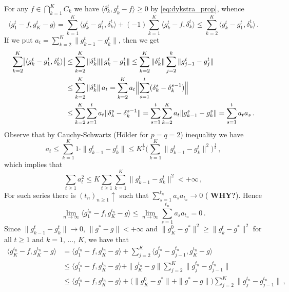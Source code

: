 \documentclass[a4paper]{article}
\begin{document}

For any $f\in \bigcap_{k=1}^K C_k$ we have $\langle \delta^t_k,  g^t_k - f \rangle
\geq 0$ by \eqref{eq:dykstra_prop}, whence
\begin{equation*}
  \langle g^t_1 - f, g^t_K - g \rangle
    = \sum_{k=1}^K \langle g^t_k - g^t_1, \delta^t_k \rangle
      + (-1) \sum_{k=1}^K \langle g^t_k - f, \delta^t_k \rangle
    \leq \sum_{k=2}^K \langle g^t_k - g^t_1, \delta^t_k \rangle
      \,.
\end{equation*}
If we put $a_t = \sum_{k=2}^K \| g^t_{k-1} - g^t_k \|$, then we get
\begin{align*}
  \sum_{k=2}^K \bigl\lvert \langle g^t_k - g^t_1, \delta^t_k \rangle \bigr\rvert
    &\leq \sum_{k=2}^K \|\delta^t_k\| \| g^t_k - g^t_1 \|
    \leq \sum_{k=2}^K \|\delta^t_k\| \sum_{j=2}^k \| g^t_{j-1} - g^t_j \|
    \\
    &\leq \sum_{k=2}^K \|\delta^t_k\| \, a_t
    = \sum_{k=2}^K a_t \Bigl\| \sum_{s=1}^t (\delta^s_k - \delta^{s-1}_k) \Bigr\|
    \\
    &\leq \sum_{k=2}^K \sum_{s=1}^t a_t \|\delta^s_k - \delta^{s-1}_k \|
    = \sum_{s=1}^t \sum_{k=2}^K a_t \|g^s_{k-1} - g^s_k \|
    = \sum_{s=1}^t a_t a_s
      \,.
\end{align*}
Observe that by Cauchy-Schwartz (H{\"o}lder for $p=q=2$) inequality we have
\begin{equation*}
  a_t
    \leq \sum_{k=1}^K 1 \cdot \| g^t_{k-1} - g^t_k \|
    \leq K^{\tfrac12} \biggl(
      \sum_{k=1}^K \| g^t_{k-1} - g^t_k \|^2
    \biggr)^{\tfrac12}
    \,,
\end{equation*}
which implies that
\begin{equation*}
  \sum_{t\geq 1} a^2_t
    \leq K \sum_{t\geq 1} \sum_{k=1}^K \| g^t_{k-1} - g^t_k \|^2
      < +\infty
    \,,
\end{equation*}
For such series there is $(t_n)_{n\geq1} \uparrow$ such that $\sum_{s=1}^{t_n} a_s
a_{t_n} \to 0$ ({\bf \color{red} WHY?}). Hence
\begin{equation*}
  \lim_{n \to \infty} \langle g^{t_n}_1 - f, g^{t_n}_K - g \rangle
    \leq \lim_{n \to \infty} \sum_{s=1}^{t_n} a_s a_{t_n}
    = 0
    \,.
\end{equation*}
Since $\|g^t_{k-1} - g^t_k \| \to 0$, $\|g^*-g\|<+\infty$ and $\|g^0_K - g^*\|^2
\geq \|g^t_k - g^*\|^2$ for all $t\geq 1$ and $k=1,\,\ldots,\,K$, we have that
\begin{align*}
  \langle g^{t_n}_K - f, g^{t_n}_K - g \rangle
    &= \langle g^{t_n}_1 - f, g^{t_n}_K - g \rangle
      + \sum_{j=2}^K \langle g^{t_n}_j - g^{t_n}_{j-1}, g^{t_n}_K - g \rangle
      \\
    &\leq \langle g^{t_n}_1 - f, g^{t_n}_K - g \rangle
      + \|g^{t_n}_K - g\| \sum_{j=2}^K \|g^{t_n}_j - g^{t_n}_{j-1}\|
      \\
    &\leq \langle g^{t_n}_1 - f, g^{t_n}_K - g \rangle
      + \bigl(\|g^0_K - g^*\| + \|g^* - g\| \bigr)\sum_{j=2}^K \|g^{t_n}_j - g^{t_n}_{j-1}\|
      \,,
\end{align*}
\end{document}
